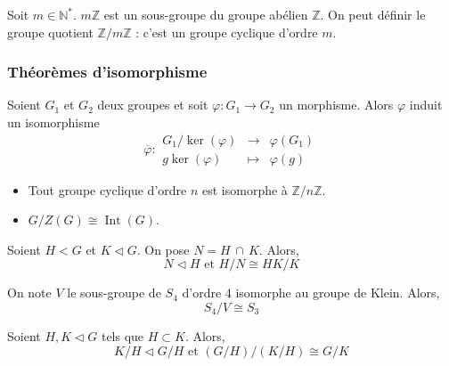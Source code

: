   \begin{example}
    Soit $m \in \mathbb{N}^*$. $m \mathbb{Z}$ est un sous-groupe du groupe abélien $\mathbb{Z}$. On peut définir le groupe quotient $\mathbb{Z}/m\mathbb{Z}$ : c'est un groupe cyclique d'ordre $m$.
  \end{example}

  \subsubsection{Théorèmes d'isomorphisme}


  \begin{theorem}
    Soient $G_1$ et $G_2$ deux groupes et soit $\varphi : G_1 \rightarrow G_2$ un morphisme. Alors $\varphi$ induit un isomorphisme
    \[
      \overline{\varphi} :
      \begin{array}{ccc}
        G_1 / \ker(\varphi) &\rightarrow& \varphi(G_1) \\
        g\ker(\varphi) &\mapsto& \varphi(g)
      \end{array}
    \]
  \end{theorem}

  \begin{example}
    \begin{itemize}
      \item Tout groupe cyclique d'ordre $n$ est isomorphe à $\mathbb{Z}/n\mathbb{Z}$.
      \item $G/Z(G) \cong \operatorname{Int}(G)$.
    \end{itemize}
  \end{example}


  \begin{theorem}
    Soient $H < G$ et $K \lhd G$. On pose $N = H \, \cap \, K$. Alors,
    \[ N \lhd H \text{ et } H/N \cong HK/K \]
  \end{theorem}

  \begin{example}
    On note $V$ le sous-groupe de $S_4$ d'ordre $4$ isomorphe au groupe de Klein. Alors,
    \[ S_4/V \cong S_3 \]
  \end{example}


  \begin{theorem}
    Soient $H, K \lhd G$ tels que $H \subset K$. Alors,
    \[ K/H \lhd G/H \text{ et } (G/H)/(K/H) \cong G/K \]
  \end{theorem}

